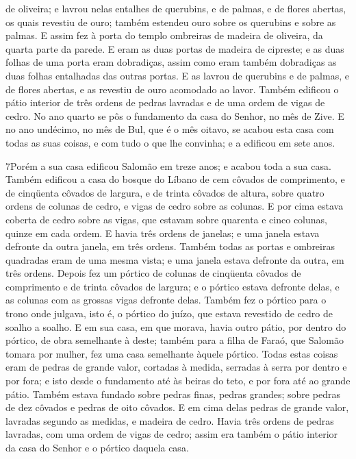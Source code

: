 de oliveira; e lavrou nelas entalhes de querubins, e de palmas, e de
flores abertas, os quais revestiu de ouro; também estendeu ouro
sobre os querubins e sobre as palmas. E assim fez à porta do
templo ombreiras de madeira de oliveira, da quarta parte da parede.
E eram as duas portas de madeira de cipreste; e as duas
folhas de uma porta eram dobradiças, assim como eram também
dobradiças as duas folhas entalhadas das outras portas. E as
lavrou de querubins e de palmas, e de flores abertas, e as revestiu
de ouro acomodado ao lavor. Também edificou o pátio interior
de três ordens de pedras lavradas e de uma ordem de vigas de cedro.
No ano quarto se pôs o fundamento da casa do Senhor, no mês
de Zive. E no ano undécimo, no mês de Bul, que é o mês
oitavo, se acabou esta casa com todas as suas coisas, e com tudo o
que lhe convinha; e a edificou em sete anos.

\medskip

\lettrine{7} Porém a sua casa edificou Salomão em treze anos;
e acabou toda a sua casa. Também edificou a casa do bosque do
Líbano de cem côvados de comprimento, e de cinqüenta côvados de
largura, e de trinta côvados de altura, sobre quatro ordens de
colunas de cedro, e vigas de cedro sobre as colunas. E por cima
estava coberta de cedro sobre as vigas, que estavam sobre quarenta e
cinco colunas, quinze em cada ordem. E havia três ordens de
janelas; e uma janela estava defronte da outra janela, em três
ordens. Também todas as portas e ombreiras quadradas eram de uma
mesma vista; e uma janela estava defronte da outra, em três ordens.
Depois fez um pórtico de colunas de cinqüenta côvados de
comprimento e de trinta côvados de largura; e o pórtico estava
defronte delas, e as colunas com as grossas vigas defronte delas.
Também fez o pórtico para o trono onde julgava, isto é, o
pórtico do juízo, que estava revestido de cedro de soalho a soalho.
E em sua casa, em que morava, havia outro pátio, por dentro do
pórtico, de obra semelhante à deste; também para a filha de Faraó,
que Salomão tomara por mulher, fez uma casa semelhante àquele
pórtico. Todas estas coisas eram de pedras de grande valor,
cortadas à medida, serradas à serra por dentro e por fora; e isto
desde o fundamento até às beiras do teto, e por fora até ao grande
pátio. Também estava fundado sobre pedras finas, pedras
grandes; sobre pedras de dez côvados e pedras de oito côvados.
E em cima delas pedras de grande valor, lavradas segundo as
medidas, e madeira de cedro. Havia três ordens de pedras
lavradas, com uma ordem de vigas de cedro; assim era também o pátio
interior da casa do Senhor e o pórtico daquela casa.

